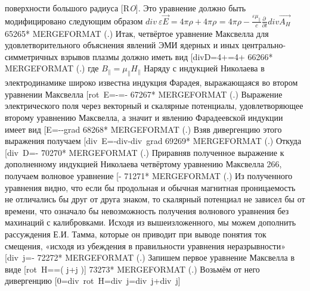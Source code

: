 \documentclass[11pt]{article}
\begin{document}
поверхности большого радиуса {[}{{R}\emph{{O}}{]}. Это уравнение
должно быть модифицировано следующим образом
\(div\ \varepsilon \overrightarrow{E}=4\pi \rho +4\pi {{\rho }_{}}=4\pi \rho -\frac{\varepsilon {{\mu }_{\parallel }}}{c}\frac{\partial \ }{\partial t}div\overrightarrow{{{A}_{H}}}\)
65265* MERGEFORMAT (.) Итак, четвёртое уравнение Максвелла для
удовлетворительного объяснения явлений ЭМИ ядерных и иных
центрально-симметричных взрывов плазмы должно иметь вид
{[}divD=4\pi \rho +=4\pi \rho +\frac{\partial {{B}_{\parallel }}}{\partial t}{]}
66266* MERGEFORMAT (.) где
\({{B}_{\parallel }}={{\mu }_{\parallel }}{{H}_{\parallel }}\) Наряду с
индукцией Николаева в электродинамике широко известна индукция Фарадея,
выражающаяся во втором уравнении Максвелла
{[}rot~E=-=-\frac{\partial {{H}_{\bot }}}{\partial t}{]}
67267* MERGEFORMAT (.) Выражение электрического поля через векторный и
скалярные потенциалы, удовлетворяющее второму уравнению Максвелла, а
значит и явлению Фарадеевской индукции имеет вид
{[}E=--grad\varphi {]}
68268* MERGEFORMAT (.) Взяв дивергенцию этого выражения получаем
{[}div~E=-div-div~grad\varphi {]}
69269* MERGEFORMAT (.) Откуда
{[}div~D=-\varphi {]}
70270* MERGEFORMAT (.) Приравняв полученное выражение к дополненному
индукцией Николаева четвёртому уравнению Максвелла 266, получаем
волновое уравнение
{[}-\pi \rho {]}
71271* MERGEFORMAT (.) Из полученного уравнения видно, что если бы
продольная и обычная магнитная проницаемость не отличались бы друг от
друга знаком, то скалярный потенциал не зависел бы от времени, что
означало бы невозможность получения волнового уравнения без махинаций с
калибровками. Исходя из вышеизложенного, мы можем дополнить рассуждения
Е.И. Тамма, которые он приводит при выводе понятия ток смещения, «исходя
из убеждения в правильности уравнения неразрывности»
{[}div~j=-\rho {]} 72272* MERGEFORMAT (.)
Запишем первое уравнение Максвелла в виде
{[}rot~H==\left( j+{{j}}{}}
\right){]} 73273* MERGEFORMAT (.) Возьмём от него дивергенцию
{[}0=div~rot~H=div~{{j}\emph{{}}=div~j+div~{{j}}{}}{]}
\end{document}
